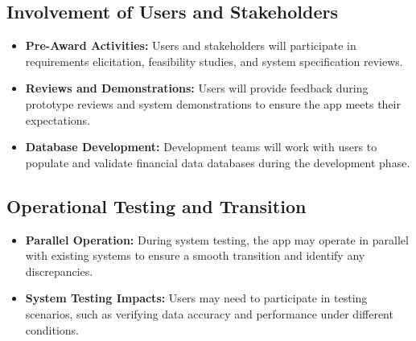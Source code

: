 \subsection{Involvement of Users and Stakeholders}
\begin{itemize}
    \item \textbf{Pre-Award Activities:} Users and stakeholders will participate in requirements elicitation, feasibility studies, and system specification reviews.
    \item \textbf{Reviews and Demonstrations:} Users will provide feedback during prototype reviews and system demonstrations to ensure the app meets their expectations.
    \item \textbf{Database Development:} Development teams will work with users to populate and validate financial data databases during the development phase.
\end{itemize}

\subsection{Operational Testing and Transition}
\begin{itemize}
    \item \textbf{Parallel Operation:} During system testing, the app may operate in parallel with existing systems to ensure a smooth transition and identify any discrepancies.
    \item \textbf{System Testing Impacts:} Users may need to participate in testing scenarios, such as verifying data accuracy and performance under different conditions.
\end{itemize}


